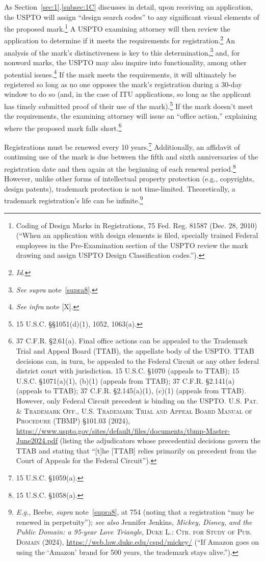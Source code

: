 \documentclass[letterpaper, 11pt, oneside]{article}
\begin{document}
As Section~\ref{sec:1}.\ref{subsec:1C} discusses in detail, upon receiving an application, the USPTO will assign ``design search codes'' to any significant visual elements of the proposed mark.\footnote{\label{supra10} Coding of Design Marks in Registrations, 75 Fed. Reg. 81587 (Dec. 28, 2010) (``When an application with design elements is filed, specially trained Federal employees in the Pre-Examination section of the USPTO review the mark drawing and assign USPTO Design Classification codes.'').} A USPTO examining attorney will then review the application to determine if it meets the requirements for registration.\footnote{\textit{Id.}} An analysis of the mark's distinctiveness is key to this determination,\footnote{\textit{See supra} note~\ref{supra8}.} and, for nonword marks, the USPTO may also inquire into functionality, among other potential issues.\footnote{\textit{See infra} note [X].} If the mark meets the requirements, it will ultimately be registered so long as no one opposes the mark's registration during a 30-day window to do so (and, in the case of ITU applications, so long as the applicant has timely submitted proof of their use of the mark).\footnote{15 U.S.C. \S\S 1051(d)(1), 1052, 1063(a).} If the mark doesn't meet the requirements, the examining attorney will issue an ``office action,'' explaining where the proposed mark falls short.\footnote{37 C.F.R. \S 2.61(a). Final office actions can be appealed to the Trademark Trial and Appeal Board (TTAB), the appellate body of the USPTO. TTAB decisions can, in turn, be appealed to the Federal Circuit or any other federal district court with jurisdiction. 15 U.S.C. \S 1070 (appeals to TTAB); 15 U.S.C. \S 1071(a)(1), (b)(1) (appeals from TTAB); 37 C.F.R. \S 2.141(a) (appeals to TTAB); 37 C.F.R. \S 2.145(a)(1), (c)(1) (appeals from TTAB). However, only Federal Circuit precedent is binding on the USPTO. \textsc{U.S. Pat. \& Trademark Off., U.S. Trademark Trial and Appeal Board Manual of Procedure (TBMP)} \S 101.03 (2024), \url{https://www.uspto.gov/sites/default/files/documents/tbmp-Master-June2024.pdf} (listing the adjudicators whose precedential decisions govern the TTAB and stating that ``[t]he [TTAB] relies primarily on precedent from the Court of Appeals for the Federal Circuit'').}

Registrations must be renewed every 10 years.\footnote{15 U.S.C. \S 1059(a).} Additionally, an affidavit of continuing use of the mark is due between the fifth and sixth anniversaries of the registration date and then again at the beginning of each renewal period.\footnote{15 U.S.C. \S 1058(a).} However, unlike other forms of intellectual property protection (e.g., copyrights, design patents), trademark protection is not time-limited. Theoretically, a trademark registration's life can be infinite.\footnote{\textit{E.g.}, Beebe, \textit{supra} note~\ref{supra8}, at 754 (noting that a registration ``may be renewed in perpetuity''); \textit{see also} Jennifer Jenkins, \textit{Mickey, Disney, and the Public Domain: a 95-year Love Triangle}, \textsc{Duke L.: Ctr. for Study of Pub. Domain} (2024), \url{https://web.law.duke.edu/cspd/mickey/} (``If Amazon goes on using the `Amazon' brand for 500 years, the trademark stays alive.'').} 
\end{document}
